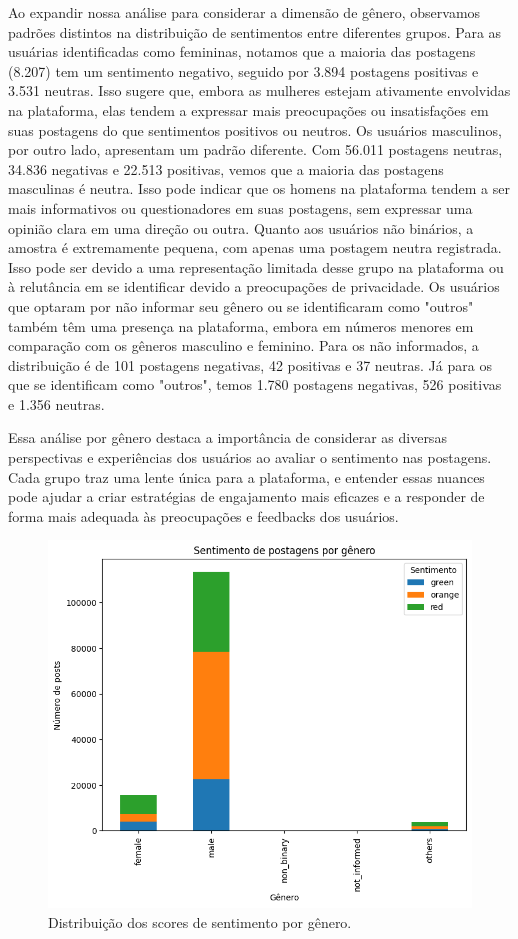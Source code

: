 Ao expandir nossa análise para considerar a dimensão de gênero, observamos padrões distintos na distribuição de sentimentos entre diferentes grupos. Para as usuárias identificadas como femininas, notamos que a maioria das postagens (8.207) tem um sentimento negativo, seguido por 3.894 postagens positivas e 3.531 neutras. Isso sugere que, embora as mulheres estejam ativamente envolvidas na plataforma, elas tendem a expressar mais preocupações ou insatisfações em suas postagens do que sentimentos positivos ou neutros. Os usuários masculinos, por outro lado, apresentam um padrão diferente. Com 56.011 postagens neutras, 34.836 negativas e 22.513 positivas, vemos que a maioria das postagens masculinas é neutra. Isso pode indicar que os homens na plataforma tendem a ser mais informativos ou questionadores em suas postagens, sem expressar uma opinião clara em uma direção ou outra. Quanto aos usuários não binários, a amostra é extremamente pequena, com apenas uma postagem neutra registrada. Isso pode ser devido a uma representação limitada desse grupo na plataforma ou à relutância em se identificar devido a preocupações de privacidade. Os usuários que optaram por não informar seu gênero ou se identificaram como "outros" também têm uma presença na plataforma, embora em números menores em comparação com os gêneros masculino e feminino. Para os não informados, a distribuição é de 101 postagens negativas, 42 positivas e 37 neutras. Já para os que se identificam como "outros", temos 1.780 postagens negativas, 526 positivas e 1.356 neutras.

Essa análise por gênero destaca a importância de considerar as diversas perspectivas e experiências dos usuários ao avaliar o sentimento nas postagens. Cada grupo traz uma lente única para a plataforma, e entender essas nuances pode ajudar a criar estratégias de engajamento mais eficazes e a responder de forma mais adequada às preocupações e feedbacks dos usuários.

\begin{figure}[!htb]
	\caption{Distribuição dos scores de sentimento por gênero.}
	\label{fig:sentiment_by_gender}
	\centering
	\includegraphics[scale=0.75]{images/sentiment_by_gender.png}
	\fautor
\end{figure}

